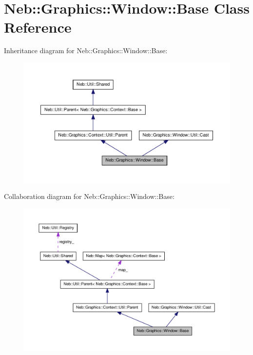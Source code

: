 \hypertarget{classNeb_1_1Graphics_1_1Window_1_1Base}{\section{\-Neb\-:\-:\-Graphics\-:\-:\-Window\-:\-:\-Base \-Class \-Reference}
\label{classNeb_1_1Graphics_1_1Window_1_1Base}
}


\-Inheritance diagram for \-Neb\-:\-:\-Graphics\-:\-:\-Window\-:\-:\-Base\-:\nopagebreak
\begin{figure}[H]
\begin{center}
\leavevmode
\includegraphics[width=350pt]{classNeb_1_1Graphics_1_1Window_1_1Base__inherit__graph}
\end{center}
\end{figure}


\-Collaboration diagram for \-Neb\-:\-:\-Graphics\-:\-:\-Window\-:\-:\-Base\-:\nopagebreak
\begin{figure}[H]
\begin{center}
\leavevmode
\includegraphics[width=350pt]{classNeb_1_1Graphics_1_1Window_1_1Base__coll__graph}
\end{center}
\end{figure}
